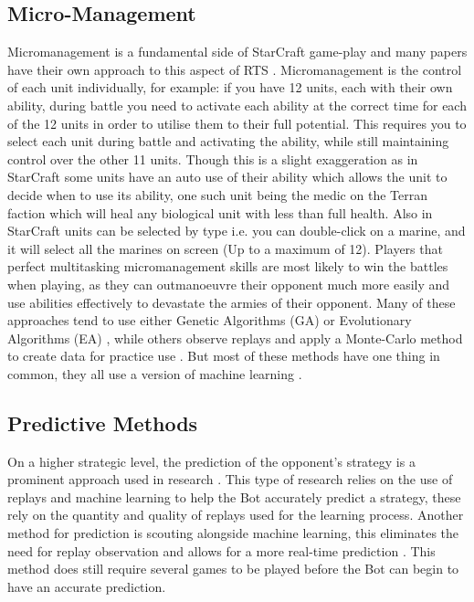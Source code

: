 \documentclass[journal]{IEEEtran}
\begin{document}
	\subsection{Micro-Management}
	Micromanagement is a fundamental side of StarCraft game-play and many papers have their own approach to this aspect of RTS \cite{SOMA,EffectiveMicro,Swarm,MM,SpecialTactics,UnitsControl}. Micromanagement is the control of each unit individually, for example: if you have 12 units, each with their own ability, during battle you need to activate each ability at the correct time for each of the 12 units in order to utilise them to their full potential. This requires you to select each unit during battle and activating the ability, while still maintaining control over the other 11 units. Though this is a slight exaggeration as in StarCraft some units have an auto use of their ability which allows the unit to decide when to use its ability, one such unit being the medic on the Terran faction which will heal any biological unit with less than full health. Also in StarCraft units can be selected by type i.e. you can double-click on a marine, and it will select all the marines on screen (Up to a maximum of 12). Players that perfect multitasking micromanagement skills are most likely to win the battles when playing, as they can outmanoeuvre their opponent much more easily and use abilities effectively to devastate the armies of their opponent. Many of these approaches tend to use either Genetic Algorithms (GA) or Evolutionary Algorithms (EA) \cite{SOMA, EffectiveMicro, Swarm}, while others observe replays and apply a Monte-Carlo method to create data for practice use \cite{MM}. But most of these methods have one thing in common, they all use a version of machine learning \cite{Survey}.
	
	\subsection{Predictive Methods}
	On a higher strategic level, the prediction of the opponent's strategy is a prominent approach used in research \cite{DataMine, Bayesian, Scouting, ReplayPred}. This type of research relies on the use of replays and machine learning to help the Bot accurately predict a strategy, these rely on the quantity and quality of replays used for the learning process\cite{DataMine,Bayesian,ReplayPred}. Another method for prediction is scouting alongside machine learning, this eliminates the need for replay observation and allows for a more real-time prediction \cite{Scouting}. This method does still require several games to be played before the Bot can begin to have an accurate prediction.
	
\end{document}
